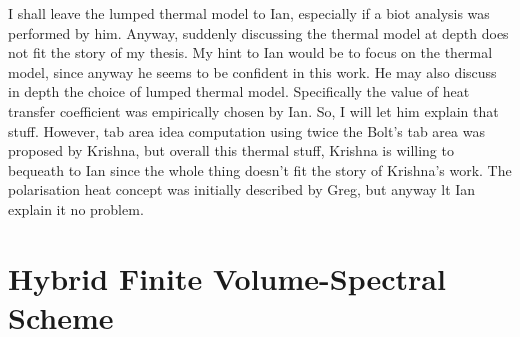 I shall leave the lumped thermal model to Ian, especially if a biot analysis was
performed by  him. Anyway, suddenly discussing  the thermal model at  depth does
not fit the story of my thesis. My hint  to Ian would be to focus on the thermal
model, since anyway he  seems to be confident in this work.  He may also discuss
in depth  the choice  of lumped  thermal model. Specifically  the value  of heat
transfer coefficient was  empirically chosen by Ian. So, I  will let him explain
that stuff. However,  tab area idea computation using twice  the Bolt's tab area
was proposed by  Krishna, but overall this thermal stuff,  Krishna is willing to
bequeath to Ian since  the whole thing doesn't fit the  story of Krishna's work.
The polarisation heat concept was initially described by Greg, but anyway lt Ian
explain it no problem.



\section{Hybrid Finite Volume-Spectral Scheme}\label{sec:hybrid fv-spectral}

